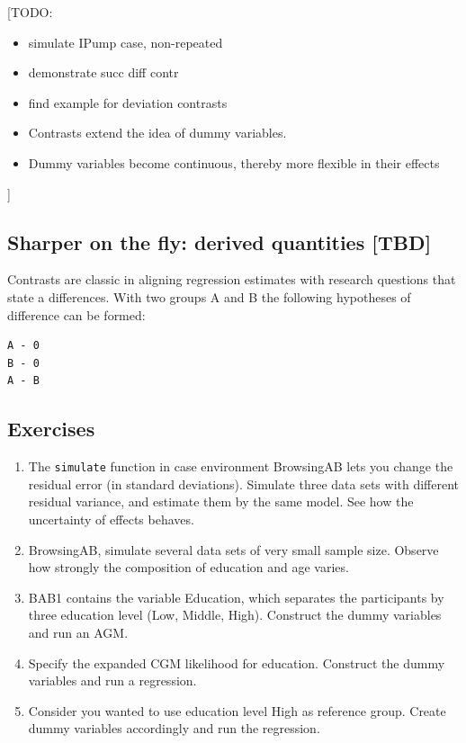 \documentclass[]{svmono}
\theoremstyle{definition}
\theoremstyle{definition}
\theoremstyle{definition}
\theoremstyle{remark}
\begin{document}
{[}TODO:

\begin{itemize}
\item
  simulate IPump case, non-repeated
\item
  demonstrate succ diff contr
\item
  find example for deviation contrasts
\item
  Contrasts extend the idea of dummy variables.
\item
  Dummy variables become continuous, thereby more flexible in their
  effects
\end{itemize}

{]}

\subsection{Sharper on the fly: derived quantities
{[}TBD{]}}\label{sharper-on-the-fly-derived-quantities-tbd}

Contrasts are classic in aligning regression estimates with research
questions that state a differences. With two groups A and B the
following hypotheses of difference can be formed:

\begin{verbatim}
A - 0
B - 0
A - B
\end{verbatim}

\subsection{Exercises}\label{exercises-3}

\begin{enumerate}
\def\labelenumi{\arabic{enumi}.}
\item
  The \texttt{simulate} function in case environment BrowsingAB lets you
  change the residual error (in standard deviations). Simulate three
  data sets with different residual variance, and estimate them by the
  same model. See how the uncertainty of effects behaves.
\item
  BrowsingAB, simulate several data sets of very small sample size.
  Observe how strongly the composition of education and age varies.
\item
  BAB1 contains the variable Education, which separates the participants
  by three education level (Low, Middle, High). Construct the dummy
  variables and run an AGM.
\item
  Specify the expanded CGM likelihood for education. Construct the dummy
  variables and run a regression.
\item
  Consider you wanted to use education level High as reference group.
  Create dummy variables accordingly and run the regression.
\end{enumerate}
\end{document}
